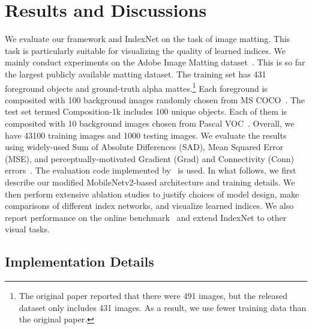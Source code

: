 \documentclass[10pt,twocolumn,letterpaper]{article}
\begin{document}
\section{Results and Discussions}

We evaluate our framework and IndexNet on the task of image matting. This task is particularly suitable for visualizing the quality of learned indices. We mainly conduct experiments on the Adobe Image Matting dataset~\cite{xu2017deep}. This is so far the largest publicly available matting dataset. The training set has 431 foreground objects and ground-truth alpha mattes.\footnote{The original paper reported that there were 491 images, but the released dataset only includes 431 images.
As a result, we
use fewer
training data
than the original paper.}
Each foreground is composited with 100 background images randomly chosen from MS COCO~\cite{lin2014microsoft}. The test set termed Composition-1k includes 100 unique objects. Each of them is composited with 10 background images chosen from Pascal VOC~\cite{everingham2010pascal}. Overall, we have 43100 training images and 1000 testing images. We evaluate the results using widely-used Sum of Absolute Differences (SAD), Mean Squared Error (MSE), and perceptually-motivated Gradient (Grad) and Connectivity (Conn) errors~\cite{rhemann2009perceptually}. The evaluation code implemented by~\cite{xu2017deep} is used. In what follows, we first describe our modified MobileNetv2-based architecture and training details. We then perform extensive ablation studies to justify choices of model design, make comparisons of different index networks, and visualize learned indices. We also report performance on the  online benchmark~\cite{rhemann2009perceptually} and extend IndexNet to other visual tasks.

\subsection{Implementation Details}
\end{document}
